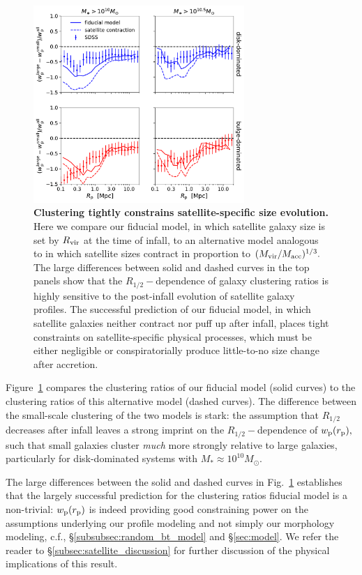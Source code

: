 \documentclass[usenatbib,usegraphicx,letterpaper]{mn2e}
\newcommand{\rhalf}{R_{1/2}}
\newcommand{\mstar}{M_{\ast}}
\newcommand{\mvir}{M_{\rm vir}}
\newcommand{\macc}{M_{\rm acc}}
\newcommand{\rvir}{R_{\rm vir}}
\newcommand{\rproj}{r_{\rm p}}
\newcommand{\wproj}{w_{\rm p}}
\newcommand{\msun}{M_\odot}
\begin{document}
\begin{figure}
\centering
\includegraphics[width=8cm]{FIGS/alternate_satellite_models_size_clustering_ratios.pdf}
\caption{
{\bf Clustering tightly constrains satellite-specific size evolution.}
Here we compare our fiducial model, in which satellite galaxy size is set by $\rvir$ at the time of infall, to an alternative model analogous to \citet{watson_etal12} in which satellite sizes contract in proportion to $(\mvir/\macc)^{1/3}.$ The large differences between solid and dashed curves in the top panels show that the $\rhalf-$dependence of galaxy clustering ratios is highly sensitive to the post-infall evolution of satellite galaxy profiles. The successful prediction of our fiducial model, in which satellite galaxies neither contract nor puff up after infall, places tight constraints on satellite-specific physical processes, which must be either negligible or conspiratorially produce little-to-no size change after accretion.
}
\label{fig:satellites}
\end{figure}

Figure~\ref{fig:satellites} compares the clustering ratios of our fiducial model (solid curves) to the clustering ratios of this alternative model (dashed curves). The difference between the small-scale clustering of the two models is stark: the assumption that $\rhalf$ decreases after infall leaves a strong imprint on the $\rhalf-$dependence of $\wproj(\rproj),$ such that small galaxies cluster {\em much} more strongly relative to large galaxies, particularly for disk-dominated systems with $\mstar\approx10^{10}\msun.$

The large differences between the solid and dashed curves in Fig.~\ref{fig:satellites} establishes that the largely successful prediction for the clustering ratios fiducial model is a non-trivial: $\wproj(\rproj)$ is indeed providing good constraining power on the  assumptions underlying our profile modeling and not simply our morphology modeling, c.f., \S\ref{subsubsec:random_bt_model} and \S\ref{sec:model}. We refer the reader to \S\ref{subsec:satellite_discussion} for further discussion of the physical implications of this result.
\end{document}
